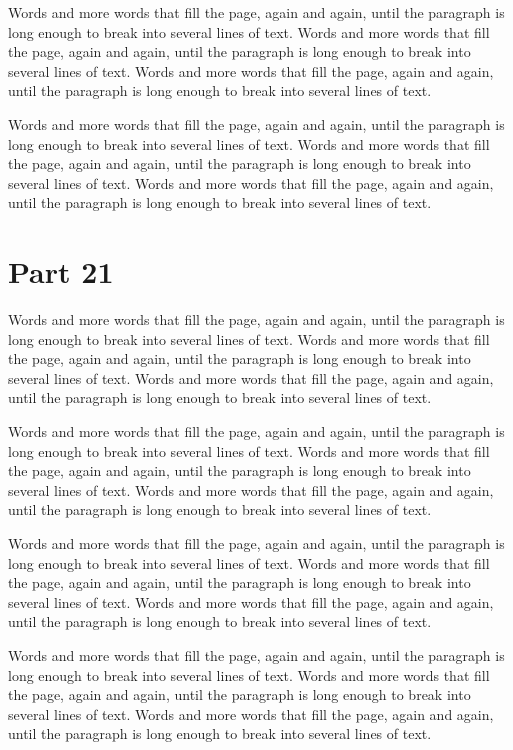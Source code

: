 \documentclass{article}
\begin{document}
Words and more words that fill the page, again and again, until the paragraph is long enough to break into several lines of text. Words and more words that fill the page, again and again, until the paragraph is long enough to break into several lines of text. Words and more words that fill the page, again and again, until the paragraph is long enough to break into several lines of text. 

Words and more words that fill the page, again and again, until the paragraph is long enough to break into several lines of text. Words and more words that fill the page, again and again, until the paragraph is long enough to break into several lines of text. Words and more words that fill the page, again and again, until the paragraph is long enough to break into several lines of text. 

\section{Part 21}
Words and more words that fill the page, again and again, until the paragraph is long enough to break into several lines of text. Words and more words that fill the page, again and again, until the paragraph is long enough to break into several lines of text. Words and more words that fill the page, again and again, until the paragraph is long enough to break into several lines of text. 

Words and more words that fill the page, again and again, until the paragraph is long enough to break into several lines of text. Words and more words that fill the page, again and again, until the paragraph is long enough to break into several lines of text. Words and more words that fill the page, again and again, until the paragraph is long enough to break into several lines of text. 

Words and more words that fill the page, again and again, until the paragraph is long enough to break into several lines of text. Words and more words that fill the page, again and again, until the paragraph is long enough to break into several lines of text. Words and more words that fill the page, again and again, until the paragraph is long enough to break into several lines of text. 

Words and more words that fill the page, again and again, until the paragraph is long enough to break into several lines of text. Words and more words that fill the page, again and again, until the paragraph is long enough to break into several lines of text. Words and more words that fill the page, again and again, until the paragraph is long enough to break into several lines of text. 
\end{document}
